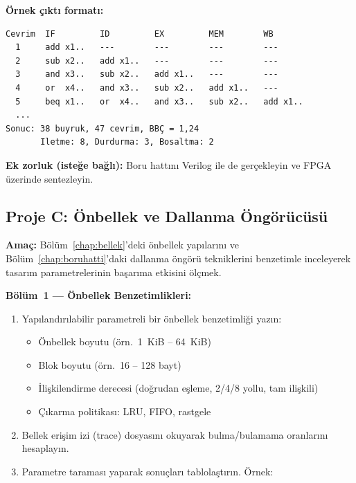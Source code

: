 \textbf{Örnek çıktı formatı:}
\begin{lstlisting}[numbers=none, basicstyle=\ttfamily\footnotesize]
Cevrim  IF         ID         EX         MEM        WB
  1     add x1..   ---        ---        ---        ---
  2     sub x2..   add x1..   ---        ---        ---
  3     and x3..   sub x2..   add x1..   ---        ---
  4     or  x4..   and x3..   sub x2..   add x1..   ---
  5     beq x1..   or  x4..   and x3..   sub x2..   add x1..
  ...
Sonuc: 38 buyruk, 47 cevrim, BBÇ = 1,24
       Iletme: 8, Durdurma: 3, Bosaltma: 2
\end{lstlisting}

\textbf{Ek zorluk (isteğe bağlı):} Boru hattını Verilog ile de gerçekleyin ve FPGA üzerinde sentezleyin.


\subsection{Proje C: Önbellek ve Dallanma Öngörücüsü}
\label{sec:ekd-proje-c}

\textbf{Amaç:} Bölüm~\ref{chap:bellek}'deki önbellek yapılarını ve Bölüm~\ref{chap:boruhatti}'daki dallanma öngörü tekniklerini benzetimle inceleyerek tasarım parametrelerinin başarıma etkisini ölçmek.\smallskip

\textbf{Bölüm~1 --- Önbellek Benzetimlikleri:}
\begin{enumerate}[leftmargin=2em]
    \item Yapılandırılabilir parametreli bir önbellek benzetimliği yazın:
    \begin{itemize}[leftmargin=1.5em]
        \item Önbellek boyutu (örn.\ 1~KiB -- 64~KiB)
        \item Blok boyutu (örn.\ 16 -- 128 bayt)
        \item İlişkilendirme derecesi (doğrudan eşleme, 2/4/8 yollu, tam ilişkili)
        \item Çıkarma politikası: LRU, FIFO, rastgele
    \end{itemize}
    \item Bellek erişim izi (trace) dosyasını okuyarak bulma/bulamama oranlarını hesaplayın.
    \item Parametre taraması yaparak sonuçları tablolaştırın. Örnek:
\end{enumerate}


